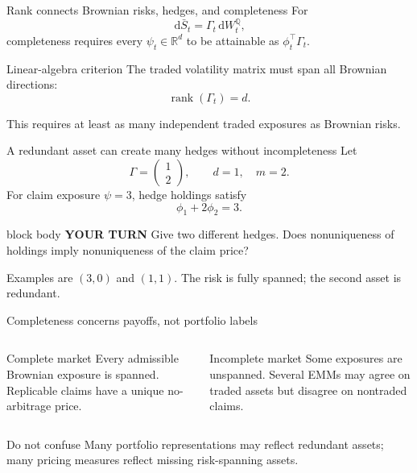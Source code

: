 \documentclass[handout,10pt,aspectratio=169]{beamer}
\newenvironment{pausebox}{\begin{beamercolorbox}[rounded=true,sep=0.8em,wd=\textwidth]{block body}
  \textbf{\color{CourseGold}YOUR TURN}\quad}{\end{beamercolorbox}}
\newcommand{\dd}{\,\mathrm d}
\newcommand{\Q}{\mathbb Q}
\newcommand{\R}{\mathbb R}
\newcommand{\1}{\mathbf 1}
\begin{document}
\begin{frame}{Rank connects Brownian risks, hedges, and completeness}
For
\[
\dd\bar S_t=\Gamma_t\dd W_t^\Q,
\]
completeness requires every \(\psi_t\in\R^d\) to be attainable as
\(\phi_t^\top\Gamma_t\).
\begin{block}{Linear-algebra criterion}
The traded volatility matrix must span all Brownian directions:
\[
\boxed{\operatorname{rank}(\Gamma_t)=d.}
\]
\end{block}
This requires at least as many independent traded exposures as Brownian risks.
\end{frame}

\begin{frame}{A redundant asset can create many hedges without incompleteness}
Let
\[
\Gamma=
\begin{pmatrix}
1\\2
\end{pmatrix},
\qquad d=1,\quad m=2.
\]
For claim exposure \(\psi=3\), hedge holdings satisfy
\[
\phi_1+2\phi_2=3.
\]
\begin{pausebox}
Give two different hedges. Does nonuniqueness of holdings imply nonuniqueness
of the claim price?
\end{pausebox}

Examples are \((3,0)\) and \((1,1)\). The risk is fully spanned; the second
asset is redundant.
\end{frame}

\begin{frame}{Completeness concerns payoffs, not portfolio labels}
\begin{columns}[T,onlytextwidth]
\begin{block}{Complete market}
Every admissible Brownian exposure is spanned. Replicable claims have a
unique no-arbitrage price.
\end{block}
\begin{alertblock}{Incomplete market}
Some exposures are unspanned. Several EMMs may agree on traded assets but
disagree on nontraded claims.
\end{alertblock}
\end{columns}
\begin{exampleblock}{Do not confuse}
Many portfolio representations may reflect redundant assets; many pricing
measures reflect missing risk-spanning assets.
\end{exampleblock}
\end{frame}

\end{document}
